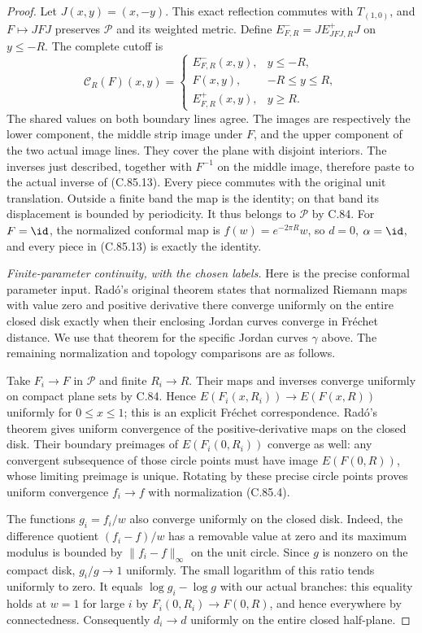 \begin{proof}
Let $J(x,y)=(x,-y)$. This exact reflection
commutes with $T_{(1,0)}$, and
$F\mapsto JFJ$ preserves $\mathscr P$
and its weighted metric. Define
$E^-_{F,R}=J E^+_{JFJ,R}J$ on $y\leq-R$.
The complete cutoff is
\[
 \mathcal C_R(F)(x,y)=
 \begin{cases}
   E^-_{F,R}(x,y),&y\leq-R,\\
   F(x,y),&-R\leq y\leq R,\\
   E^+_{F,R}(x,y),&y\geq R.
 \end{cases}                                                     \tag{C.85.13}
\]
The shared values on both boundary
lines agree. The images are respectively
the lower component, the middle strip
image under $F$, and the upper component
of the two actual image lines.
They cover the plane with disjoint
interiors. The inverses just described,
together with $F^{-1}$ on the middle
image, therefore paste to the actual
inverse of (C.85.13).
Every piece commutes with the original
unit translation. Outside a finite
band the map is the identity; on that
band its displacement is bounded by
periodicity. It thus belongs to
$\mathscr P$ by C.84. For $F=\id$,
the normalized conformal map is
$f(w)=e^{-2\pi R}w$, so $d=0$,
$\alpha=\id$, and every piece in
(C.85.13) is exactly the identity.

\emph{Finite-parameter continuity, with the chosen labels.}
Here is the precise conformal parameter
input. Rad\'o's original theorem
\cite[Section~1, p.~182; proof pp.~183--186]{C_Rado1923Variable}
states that normalized Riemann maps
with value zero and positive derivative
there converge uniformly on the entire
closed disk exactly when their enclosing
Jordan curves converge in Fr\'echet
distance. We use that theorem for the
specific Jordan curves $\gamma$ above.
The remaining normalization and topology
comparisons are as follows.

Take $F_i\to F$ in $\mathscr P$ and
finite $R_i\to R$. Their maps and
inverses converge uniformly on compact
plane sets by C.84. Hence
$E(F_i(x,R_i))\to E(F(x,R))$
uniformly for $0\leq x\leq1$; this
is an explicit Fr\'echet correspondence.
Rad\'o's theorem gives uniform
convergence of the positive-derivative
maps on the closed disk. Their boundary
preimages of $E(F_i(0,R_i))$ converge
as well: any convergent subsequence of
those circle points must have image
$E(F(0,R))$, whose limiting preimage
is unique. Rotating by these precise
circle points proves uniform convergence
$f_i\to f$ with normalization (C.85.4).

The functions $g_i=f_i/w$ also converge
uniformly on the closed disk. Indeed,
the difference quotient $(f_i-f)/w$
has a removable value at zero and its
maximum modulus is bounded by
$\|f_i-f\|_\infty$ on the unit circle.
Since $g$ is nonzero on the compact
disk, $g_i/g\to1$ uniformly. The small
logarithm of this ratio tends uniformly
to zero. It equals $\log g_i-\log g$
with our actual branches: this equality
holds at $w=1$ for large $i$ by
$F_i(0,R_i)\to F(0,R)$, and hence
everywhere by connectedness.
Consequently $d_i\to d$ uniformly on
the entire closed half-plane.


\end{proof}
